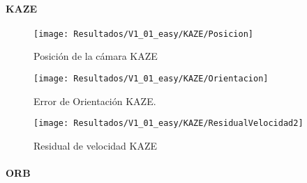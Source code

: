 \paragraph {KAZE}


\begin{figure}[H]
	\centering
	\texttt{[image: Resultados/V1\_01\_easy/KAZE/Posicion]}
	\caption{Posición de la cámara KAZE}
	\label{imagen:Resultados/V1_01_easy/KAZE/Posicion}
\end{figure}


\begin{figure}[H]
	\centering
	\texttt{[image: Resultados/V1\_01\_easy/KAZE/Orientacion]}
	\caption[Error de Orientación KAZE]{Error de Orientación KAZE.}
	\label{imagen:Resultados/V1_01_easy/KAZE/Orientacion}
\end{figure}



\begin{figure}[H]
	\centering
	\texttt{[image: Resultados/V1\_01\_easy/KAZE/ResidualVelocidad2]}
	\caption{Residual de velocidad KAZE}
	\label{imagen:Resultados/V1_01_easy/KAZE/ResidualVelocidad}
\end{figure}



%
%
%
%
%
%
%

\paragraph {ORB}


